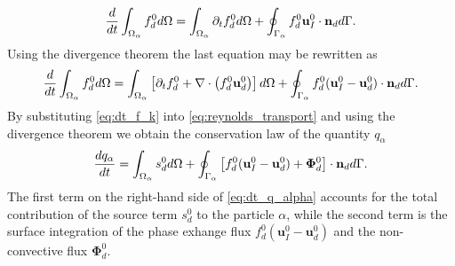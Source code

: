 \begin{equation}
   \frac{d}{dt}  \int_{\Omega_\alpha} f_d^0 d\Omega
    = \int_{\Omega_\alpha} \partial_t f_d^0  d\Omega\\
    + \oint_{\Gamma_\alpha}  f_d^0 \textbf{u}_I^0\cdot \textbf{n}_d  d\Gamma.
    \label{eq:reynolds_transport0}
\end{equation}
Using the divergence theorem the last equation may be rewritten as
\begin{equation}
    \frac{d}{dt}  \int_{\Omega_\alpha} f_d^0 d\Omega
    = \int_{\Omega_\alpha} \left[ \partial_t f_d^0 + \mathbf{\nabla}\cdot\left(f_d^0\textbf{u}_d^0\right) \right] d\Omega\\
    + \oint_{\Gamma_\alpha}  f_d^0 (\textbf{u}_I^0-\textbf{u}_d^0)\cdot \textbf{n}_d  d\Gamma.
    \label{eq:reynolds_transport}
\end{equation}
By substituting \ref{eq:dt_f_k} into \ref{eq:reynolds_transport} and using the divergence theorem we obtain the conservation law of the quantity $q_\alpha$ %
\begin{equation}
    \frac{d q_\alpha}{d t}
    = \int_{\Omega_\alpha}  s_d^0  d\Omega
    + \oint_{\Gamma_\alpha}  \left[
        f_d^0 (\textbf{u}_I^0-\textbf{u}_d^0) 
        + \mathbf{\Phi}_d^0 
        \right] \cdot \textbf{n}_d  d\Gamma.
    \label{eq:dt_q_alpha}
\end{equation}
The first term on the right-hand side of \ref{eq:dt_q_alpha} accounts for the total contribution of the source term $s_d^0$ to the particle $\alpha$,
while the second term is the surface integration of the phase exhange flux $f_d^0 (\textbf{u}_I^0-\textbf{u}_d^0)$ and the non-convective flux $\mathbf{\Phi}_d^0$.

